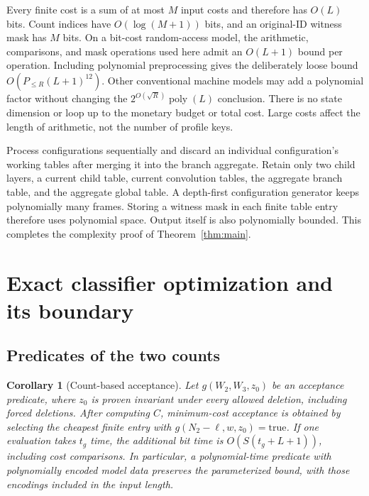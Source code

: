 \documentclass[11pt]{article}
\newtheorem{corollary}[theorem]{Corollary}
\theoremstyle{remark}
\newcommand{\poly}{\operatorname{poly}}
\newcommand{\Ppart}{P_{\le R}}
\begin{document}
Every finite cost is a sum of at most $M$ input costs and therefore has
$O(L)$ bits. Count indices have $O(\log(M+1))$ bits, and an original-ID witness
mask has $M$ bits. On a bit-cost random-access model, the arithmetic,
comparisons, and mask operations used here admit an $O(L+1)$ bound per
operation. Including polynomial preprocessing gives the deliberately loose
bound $O(\Ppart(L+1)^{12})$. Other conventional machine models may add a
polynomial factor without changing the $2^{O(\sqrt R)}\poly(L)$ conclusion.
There is no state dimension or loop up to the monetary budget or total cost.
Large costs affect the length of arithmetic, not the number of profile keys.

Process configurations sequentially and discard an individual configuration's
working tables after merging it into the branch aggregate. Retain only two
child layers, a current child table, current convolution tables, the aggregate
branch table, and the aggregate global table. A depth-first configuration
generator keeps polynomially many frames. Storing a witness mask in each
finite table entry therefore uses polynomial space. Output itself is also
polynomially bounded. This completes the complexity proof of
Theorem~\ref{thm:main}.



\section{Exact classifier optimization and its boundary}\label{sec:classifier}

\subsection{Predicates of the two counts}

\begin{corollary}[Count-based acceptance]\label{cor:classifier}
Let $g(W_2,W_3,z_0)$ be an acceptance predicate, where $z_0$ is proven invariant
under every allowed deletion, including forced deletions. After computing
$C$, minimum-cost acceptance is obtained by selecting the cheapest finite
entry with $g(N_2-\ell,w,z_0)=\mathrm{true}$. If one evaluation takes $t_g$
time, the additional bit time is $O(S(t_g+L+1))$, including cost comparisons.
In particular, a polynomial-time
predicate with polynomially encoded model data preserves the parameterized
bound, with those encodings included in the input length.
\end{corollary}
\end{document}

